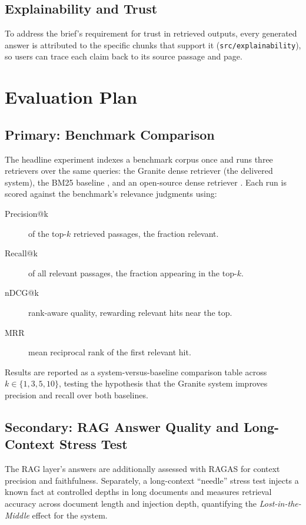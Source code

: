 \subsection{Explainability and Trust}

To address the brief's requirement for trust in retrieved outputs, every
generated answer is attributed to the specific chunks that support it
(\texttt{src/explainability}), so users can trace each claim back to its source
passage and page.

\section{Evaluation Plan}

\subsection{Primary: Benchmark Comparison}

The headline experiment indexes a benchmark corpus once and runs three
retrievers over the same queries: the Granite dense retriever (the delivered
system), the BM25 baseline \parencite{robertson2009bm25}, and an open-source
dense retriever \parencite{karpukhin2020dpr}. Each run is scored against the
benchmark's relevance judgments using:

\begin{description}
  \item[Precision@k] of the top-$k$ retrieved passages, the fraction relevant.
  \item[Recall@k] of all relevant passages, the fraction appearing in the top-$k$.
  \item[nDCG@k] rank-aware quality, rewarding relevant hits near the top.
  \item[MRR] mean reciprocal rank of the first relevant hit.
\end{description}

Results are reported as a system-versus-baseline comparison table across
$k \in \{1,3,5,10\}$, testing the hypothesis that the Granite system improves
precision and recall over both baselines.

\subsection{Secondary: RAG Answer Quality and Long-Context Stress Test}

The RAG layer's answers are additionally assessed with RAGAS
\parencite{es2023ragas} for context precision and faithfulness. Separately, a
long-context ``needle'' stress test injects a known fact at controlled depths in
long documents and measures retrieval accuracy across document length and
injection depth, quantifying the \emph{Lost-in-the-Middle} effect
\parencite{liu2024lost} for the system.

